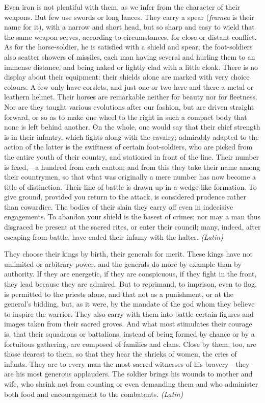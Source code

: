 Even iron is not plentiful with them, as we infer from the character of their weapons. But few use swords or long lances. They carry a spear (\emph{framea} is their name for it), with a narrow and short head, but so sharp and easy to wield that the same weapon serves, according to circumstances, for close or distant conflict. As for the horse-soldier, he is satisfied with a shield and spear; the foot-soldiers also scatter showers of missiles, each man having several and hurling them to an immense distance, and being naked or lightly clad with a little cloak. There is no display about their equipment: their shields alone are marked with very choice colours. A few only have corslets, and just one or two here and there a metal or leathern helmet. Their horses are remarkable neither for beauty nor for fleetness. Nor are they taught various evolutions after our fashion, but are driven straight forward, or so as to make one wheel to the right in such a compact body that none is left behind another. On the whole, one would say that their chief strength is in their infantry, which fights along with the cavalry; admirably adapted to the action of the latter is the swiftness of certain foot-soldiers, who are picked from the entire youth of their country, and stationed in front of the line. Their number is fixed,—a hundred from each canton; and from this they take their name among their countrymen, so that what was originally a mere number has now become a title of distinction. Their line of battle is drawn up in a wedge-like formation. To give ground, provided you return to the attack, is considered prudence rather than cowardice. The bodies of their slain they carry off even in indecisive engagements. To abandon your shield is the basest of crimes; nor may a man thus disgraced be present at the sacred rites, or enter their council; many, indeed, after escaping from battle, have ended their infamy with the halter. \emph{(Latin)}


They choose their kings by birth, their generals for merit. These kings have not unlimited or arbitrary power, and the generals do more by example than by authority. If they are energetic, if they are conspicuous, if they fight in the front, they lead because they are admired. But to reprimand, to imprison, even to flog, is permitted to the priests alone, and that not as a punishment, or at the general's bidding, but, as it were, by the mandate of the god whom they believe to inspire the warrior. They also carry with them into battle certain figures and images taken from their sacred groves. And what most stimulates their courage is, that their squadrons or battalions, instead of being formed by chance or by a fortuitous gathering, are composed of families and clans. Close by them, too, are those dearest to them, so that they hear the shrieks of women, the cries of infants. They are to every man the most sacred witnesses of his bravery—they are his most generous applauders. The soldier brings his wounds to mother and wife, who shrink not from counting or even demanding them and who administer both food and encouragement to the combatants. \emph{(Latin)}

